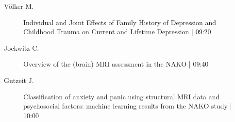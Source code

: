 \begin{symposium}
\begin{description}
                \item [ Völker M.] Individual and Joint Effects of Family History of Depression and Childhood Trauma on Current and Lifetime Depression \textcolor{mygray}{ | 09:20}    
                
                \item [ Jockwitz C.] Overview of the (brain) MRI assessment in the NAKO \textcolor{mygray}{ | 09:40}    
                
                \item [ Gutzeit J.] Classification of anxiety and panic using structural MRI data and psychosocial factors: machine learning results from the NAKO study \textcolor{mygray}{ | 10:00}    
                
            \end{description} 
            \end{symposium}
            